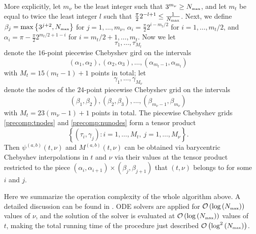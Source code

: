 \documentclass[11pt]{article}
\begin{document}
More explicitly, 
let $m_\nu$ be the least integer such that $3^{m_\nu} \geq N_{\mbox{\tiny max}}$, and let $m_t$ be equal to twice the least integer $l$ such that $\frac{\pi}{2} 2^{-l+1} \leq \frac{1}{N_{\mbox{\tiny max}}}$. Next, we define  $\beta_j = \max\left\{ 3^{j+2}, N_{\mbox{\tiny max}}\right\}$ for $j=1,\ldots,m_\nu$, $\alpha_i = \frac{\pi}{2}  2^{i-m_t/2}$ for $i=1,\ldots,m_t/2$, and $\alpha_i= \pi - \frac{\pi}{2}  2^{m_t/2+1-i}$ for $i=m_t/2+1, \ldots,m_t$. Now we let 
\begin{equation}
\tau_1,\ldots,\tau_{M_t}
\label{precomp:tnodes}
\end{equation}
denote the $16$-point piecewise Chebyshev gird on the intervals
\begin{equation}
\left(\alpha_1,\alpha_2\right), \left(\alpha_2,\alpha_3\right), \ldots,
\left(\alpha_{m_t-1},\alpha_{m_t}\right)
\label{precomp:tints}
\end{equation}
with $M_t = 15( m_t-1) + 1$ points in total; let 
\begin{equation}
\gamma_1,\ldots,\gamma_{M_\nu}
\label{precomp:nunodes}
\end{equation}
denote the nodes of the $24$-point piecewise Chebyshev grid
on the intervals
\begin{equation}
\left(\beta_1,\beta_2\right), \left(\beta_2,\beta_3\right), \ldots,
\left(\beta_{{m_\nu}-1},\beta_{m_{\nu}}\right)
\label{precomp:nuints}
\end{equation}
with $M_t = 23( m_\nu-1) + 1$ points in total. The piecewise  Chebyshev grids \eqref{precomp:tnodes} and \eqref{precomp:nunodes} form a tensor product \begin{equation}
\label{eq:tsp}
\left\{
\left(\tau_i,\gamma_j\right) : i=1,\ldots,M_t, \ j=1,\ldots,M_\nu
\right\}.
\end{equation}
Then $\psi^{(a,b)}(t,\nu)$ and $M^{(a,b)}(t,\nu)$ can be obtained via barycentric Chebyshev interpolations in $t$ and $\nu$ via their values at the tensor product restricted to the piece $\left(\alpha_i,\alpha_{i+1}\right)\times \left(\beta_j,\beta_{j+1}\right)$ that $(t,\nu)$ belongs to for some $i$ and $j$.



Here we summarize the operation complexity of the whole algorithm above. A detailed discussion can be found in \cite{Jacobi}. ODE solvers are applied for 
$\mathcal{O}\left(\log\left(N_{\mbox{\tiny max}}\right)\right)$ 
values of $\nu$, and the solution of the solver is evaluated at
$\mathcal{O}\left(\log\left(N_{\mbox{\tiny max}}\right)\right)$ 
values of $t$, making the total running time
of the procedure just described $\mathcal{O}\left(\log^2\left(N_{\mbox{\tiny max}}\right)\right)$. 
\end{document}
